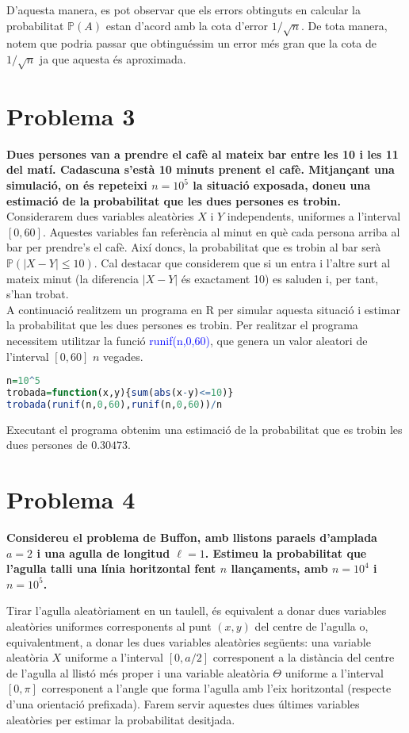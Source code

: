 \documentclass[11pt,a4paper]{article}
\begin{document}
D'aquesta manera, es pot observar que els errors obtinguts en calcular la probabilitat $\mathbb{P}(A)$ estan d'acord amb la cota d'error $1/\sqrt{n}$. De tota manera, notem que podria passar que obtinguéssim un error més gran que la cota de $1/\sqrt{n}$ ja que aquesta és aproximada.

\section*{Problema 3}
\textbf{Dues persones van a prendre el cafè al mateix bar entre les 10 i les 11 del matí. Cadascuna s'està 10 minuts prenent el cafè. Mitjançant una simulació, on és repeteixi $n=10^5$ la situació exposada, doneu una estimació de la probabilitat que les dues persones es trobin.}\\
Considerarem dues variables aleatòries $X$ i $Y$ independents, uniformes a l'interval $[0,60]$. Aquestes variables fan referència al minut en què cada persona arriba al bar per prendre's el cafè. Així doncs, la probabilitat que es trobin al bar serà $\mathbb{P}\left(|X-Y|\leq 10\right)$. Cal destacar que considerem que si un entra i l'altre surt al mateix minut (la diferencia $|X-Y|$ és exactament 10) es saluden i, per tant, s'han trobat.\\
A continuació realitzem un programa en R per simular aquesta situació i estimar la probabilitat que les dues persones es trobin. Per realitzar el programa necessitem utilitzar la funció \textcolor{blue}{runif(n,0,60)}, que genera un valor aleatori de l'interval $[0,60]$ $n$ vegades.
\begin{lstlisting}[language=R, caption={Programa de la trobada a la cafeteria},xleftmargin=.23\textwidth,xrightmargin=.23\textwidth]
n=10^5
trobada=function(x,y){sum(abs(x-y)<=10)}
trobada(runif(n,0,60),runif(n,0,60))/n
\end{lstlisting}
Executant el programa obtenim una estimació de la probabilitat que es trobin les dues persones de $0.30473$.
\newpage
\section*{Problema 4}
\textbf{Considereu el problema de Buffon, amb llistons para\lgem els d'amplada $a=2$ i una agulla de longitud $\ell=1$. Estimeu la probabilitat que l'agulla talli una línia horitzontal fent $n$ llançaments, amb $n=10^4$ i $n=10^5$.}

Tirar l'agulla aleatòriament en un taulell, és equivalent a donar dues variables aleatòries uniformes corresponents al punt $(x,y)$ del centre de l'agulla o, equivalentment, a donar les dues variables aleatòries següents: una variable aleatòria $X$ uniforme a l'interval $[0,a/2]$ corresponent a la distància del centre de l'agulla al llistó més proper i una variable aleatòria $\Theta$ uniforme a l'interval $[0,\pi]$ corresponent a l'angle que forma l'agulla amb l'eix horitzontal (respecte d'una orientació prefixada). Farem servir aquestes dues últimes variables aleatòries per estimar la probabilitat desitjada.
\end{document}
